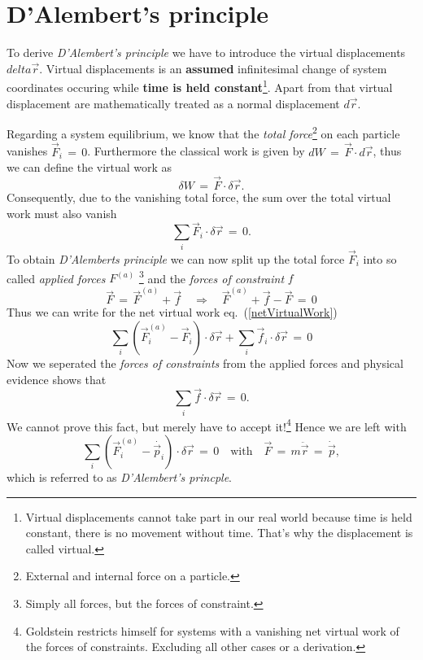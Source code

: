 \section{D'Alembert's principle}
To derive \textit{D'Alembert's principle} we have to introduce the virtual
displacements $delta \vec r$. Virtual displacements is an \textbf{assumed}
infinitesimal change of system coordinates occuring while \textbf{time is held
constant}\footnote{Virtual displacements cannot take part in our real world
because time is held constant, there is no movement without time. That's why
the displacement is called virtual.}. Apart from that virtual displacement are
mathematically treated as a normal displacement $d \vec r$. 

Regarding a system equilibrium, we know that the \textit{total
force}\footnote{External and internal force on a particle.} on each particle
vanishes $\vec F_i \,=\, 0$. Furthermore the classical work is given by $dW
\,=\, \vec F \cdot d \vec r$, thus we can define the virtual work as
\begin{equation}
  \delta W \,=\, \vec F \cdot \delta \vec r.
\end{equation}
Consequently, due to the vanishing total force, the sum over the total virtual
work must also vanish
\begin{equation}
  \label{netVirtualWork}
  \sum_{i} \vec F_i \cdot \delta \vec r \,=\, 0.
\end{equation}
To obtain \textit{D'Alemberts principle} we can now split up the total force
$\vec F_i$ into so called \textit{applied forces} $F^{(a)}$ \footnote{Simply all forces, but the
forces of constraint.} and the \textit{forces of constraint} $f$
\begin{equation}
  \vec F \,=\, \vec F^{(a)} + \vec f \quad \Rightarrow \quad \vec F^{(a)} +
\vec f - \vec F \,=\, 0 
\end{equation}
Thus we can write for the net virtual work eq.~(\ref{netVirtualWork})
\begin{equation}
  \sum_{i} (\vec F_i^{(a)} - \vec F_i) \cdot \delta \vec r + \sum_{i} \vec f_i \cdot \delta \vec r
\,=\, 0
\end{equation}
Now we seperated the \textit{forces of constraints} from the applied forces and
physical evidence shows that
\begin{equation}
  \sum_{i} \vec f \cdot \delta \vec r \,=\, 0.
\end{equation}
We cannot prove this fact, but merely have to accept it!\footnote{Goldstein
restricts himself for systems with a vanishing net virtual work of the forces
of constraints. Excluding all other cases or a derivation.} Hence we are left
with
\begin{equation}
  \label{dAlembertPrinciple}
  \sum_{i} (\vec F_i^{(a)} - \dot{\vec p_i}) \cdot \delta \vec r \,=\, 0 \quad
\text{with} \quad \vec F \,=\, m \ddot{\vec r} \,=\, \dot{\vec p},
\end{equation}
which is referred to as \textit{D'Alembert's princple}.

